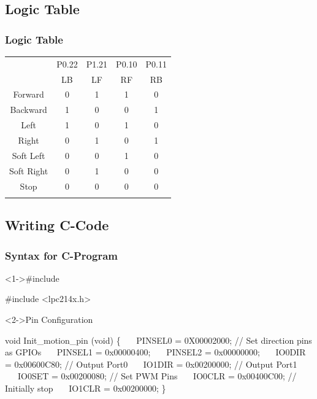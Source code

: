 \documentclass[table,10pt,red]{beamer}
\begin{document}
\subsection{Logic Table}
	\begin{frame}
	\frametitle{Logic Table} \pause
	\centering
		\begin{tabular}{!{\vrule width 2pt}c|c|c|c|c!{\vrule width 2pt}}
				 & P0.22 & P1.21 & P0.10 & P0.11\\[2pt] 
																	 & LB & LF & RF & RB 	\\ 
				 \pause 
				Forward\pause&0&\color{red}1&\color{red}1&0 \\
				\hline \pause
				Backward\pause&\color{red}1&0&0&\color{red}1\\
				\hline \pause
				Left\pause&\color{red}1&0&\color{red}1&0\\
				\hline \pause
				Right\pause&0&\color{red}1&0&\color{red}1\\
				\hline \pause
				Soft Left\pause&0&0&\color{red}1&0\\
				\hline \pause
				Soft Right\pause&0&\color{red}1&0&0 \\
				\hline \pause
				Stop\pause&0&0&0&0\\
				\hline
		\end{tabular}
	\end{frame}

\subsection{Writing C-Code}
\begin{frame}[shrink = 2,fragile] 
	\frametitle{Syntax for C-Program}\pause
	
		\begin{block}<1->{\#include}\pause
		\begin{semiverbatim}
				#include <lpc214x.h>
 		\end{semiverbatim}
		\end{block} \pause
		
	\begin{block}<2->{Pin Configuration}\pause
		\begin{semiverbatim}
				void Init_motion_pin (void)
				\{
 			\ \ \		PINSEL0 = 0X00002000;	\color{red}// Set direction pins as GPIOs  \color{black}		
 			\ \ \		PINSEL1 = 0x00000400;
 			\ \ \ PINSEL2 = 0x00000000;
 			\ \ \		IO0DIR  = 0x00600C80;  \color{red}// Output Port0 \color{black}		
 			\ \ \		IO1DIR  = 0x00200000;  \color{red}// Output Port1 \color{black}		
 			\ \ \		IO0SET  = 0x00200080; 	\color{red}// Set PWM Pins \color{black}
 			\ \ \		IO0CLR  = 0x00400C00;	\color{red}// Initially stop \color{black}
 			\ \ \		IO1CLR  = 0x00200000;
 				\}
 		\end{semiverbatim}
		\end{block}	
\end{frame}
\end{document}
